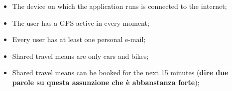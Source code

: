 \begin{itemize}
\item The device on which the application runs is connected to the internet;

\item The user has a GPS active in every moment;

\item Every user has at least one personal e-mail;

\item Shared travel means are only cars and bikes;

\item Shared travel means can be booked for the next 15 minutes (\textbf{dire due parole su questa assunzione che è abbanstanza forte});

\end{itemize}




